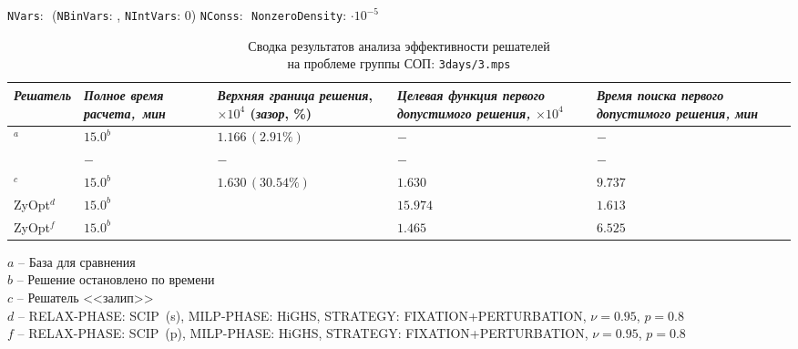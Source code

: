 \documentclass[%
	11pt,
	a4paper,
	utf8,
		]{article}
\begin{document}
\newpage

{
	\begin{table}[!h]
		\centering
		\caption{Сводка результатов анализа эффективности решателей\\ на проблеме группы СОП: \texttt{3days/3.mps}} 
		
		{\footnotesize \texttt{NVars}: $  $ (\texttt{NBinVars}: $  $,  \texttt{NIntVars}: $ 0 $) \texttt{NConss}: $  $ \texttt{NonzeroDensity}: $  \cdot 10^{-5} $}\\[2mm]
		
		\begin{tabular}{ p{2.9cm} | p{2.5cm} p{3.8cm} p{3.75cm} p{3.6cm} p{3.2cm} }
			\rowcolor{black!5}\emph{Решатель} & \emph{Полное время \mbox{расчета, мин}} & \emph{Верхняя граница} \mbox{\itshape решения}, $ \times 10^{4} $ (\emph{зазор}, \%) & \emph{Целевая функция первого допустимого решения, $ \times 10^4 $} & \emph{Время поиска первого допустимого решения, мин} \\
			\hline
			\rowcolor{blue!3}{CPLEX 12.8.0.0}$ ^a $ & $ 15.0^b $ & $ 1.166\, (2.91\%) $ & $ - $ & $ - $ \\
			\rowcolor{black!5}{SCIP 8.0.3} & $ - $ & $ - $ & $ - $ & $ - $ \\
			\rowcolor{blue!3}{HiGHS 1.5.3}$ ^c $ & $ 15.0^b $ & $ 1.630 \, (30.54\%)$ & $ 1.630 $ & $ 9.737 $ \\
			\rowcolor{black!5}ZyOpt$^d $ & {$ 15.0^b $}  & \ccb{$ 1.226 \, (7.68\%) (-5.1\%) $} & $ 15.974 $ & $ 1.613 $ \\
			\rowcolor{blue!3}ZyOpt$^f $ & {$ 15.0^b $}  & \ccb{$ 1.285 \, (11.95\%) (-10.2\%) $} & $ 1.465 $ & $ 6.525 $ 
		\end{tabular}
	\end{table}
	\vspace*{-3mm}
	\hspace*{3mm}$ a $ -- {\footnotesize База для сравнения}\\[-7mm]
	
	\hspace*{3mm}$ b $ -- {\footnotesize Решение остановлено по времени}\\[-7mm]
	
	\hspace*{3mm}$ c $ -- {\footnotesize Решатель <<залип>>}\\[-7mm]
	
	\hspace*{3mm}$ d $ -- {\footnotesize RELAX-PHASE: SCIP~(s), MILP-PHASE: HiGHS, STRATEGY: FIXATION+PERTURBATION, $ \nu = 0.95 $, $ p = 0.8 $}\\[-7mm]
	
	\hspace*{3mm}$ f $ -- {\footnotesize RELAX-PHASE: SCIP~(p), MILP-PHASE: HiGHS, STRATEGY: FIXATION+PERTURBATION, $ \nu = 0.95 $, $ p = 0.8 $}\\[-7mm]
}
\end{document}
